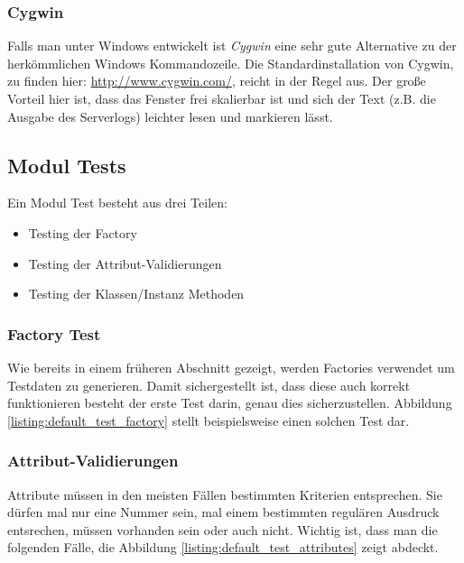 \documentclass[12pt,             %
               a4paper,          %
               listof=totoc,     %
               index=totoc,      %
               bibliography=totoc,%
               oneside,         %
               BCOR1cm,          %
               english   %
               ]{scrbook}
\begin{document}
\subsubsection{Cygwin}
Falls man unter Windows entwickelt ist \textit{Cygwin} eine sehr gute Alternative zu der herkömmlichen Windows Kommandozeile. Die Standardinstallation von Cygwin, zu finden hier: \url{http://www.cygwin.com/}, reicht in der Regel aus. Der große Vorteil hier ist, dass das Fenster frei skalierbar ist und sich der Text (z.B. die Ausgabe des Serverlogs) leichter lesen und markieren lässt. 

\subsection{Modul Tests}
Ein Modul Test besteht aus drei Teilen:
\begin{itemize}
     \item{Testing der Factory}
     \item{Testing der Attribut-Validierungen}
     \item{Testing der Klassen/Instanz Methoden}
\end{itemize}

\subsubsection{Factory Test}
Wie bereits in einem früheren Abschnitt gezeigt, werden Factories verwendet um Testdaten zu generieren. Damit sichergestellt ist, dass diese auch korrekt funktionieren besteht der erste Test darin, genau dies sicherzustellen. Abbildung \vref{listing:default_test_factory} stellt beispielsweise einen solchen Test dar.

\label{listing:default_test_factory}

\subsubsection{Attribut-Validierungen}
Attribute müssen in den meisten Fällen bestimmten Kriterien entsprechen. Sie dürfen mal nur eine Nummer sein, mal einem bestimmten regulären Ausdruck entsrechen, müssen vorhanden sein oder auch nicht. Wichtig ist, dass man die folgenden Fälle, die Abbildung \vref{listing:default_test_attributes} zeigt abdeckt.
\end{document}
